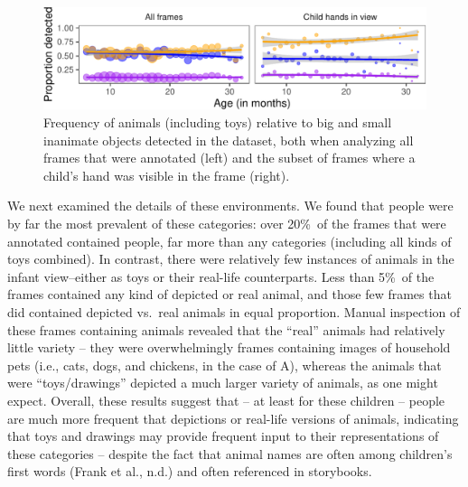 \documentclass[10pt, letterpaper]{article}
\newenvironment{CodeChunk}{}{}
\begin{document}
\begin{CodeChunk}
\begin{figure}[h]

{\centering \includegraphics{figs/anim_size-1} 

}

\caption[Frequency of animals (including toys) relative to big and small inanimate objects detected in the dataset, both when analyzing all frames that were annotated (left) and the subset of frames where a child's hand was visible in the frame (right)]{Frequency of animals (including toys) relative to big and small inanimate objects detected in the dataset, both when analyzing all frames that were annotated (left) and the subset of frames where a child's hand was visible in the frame (right).}\label{fig:anim_size}
\end{figure}
\end{CodeChunk}

We next examined the details of these environments. We found that people
were by far the most prevalent of these categories: over 20\%~of the
frames that were annotated contained people, far more than any
categories (including all kinds of toys combined). In contrast, there
were relatively few instances of animals in the infant view--either as
toys or their real-life counterparts. Less than 5\%~of the frames
contained any kind of depicted or real animal, and those few frames that
did contained depicted vs.~real animals in equal proportion. Manual
inspection of these frames containing animals revealed that the ``real''
animals had relatively little variety -- they were overwhelmingly frames
containing images of household pets (i.e., cats, dogs, and chickens, in
the case of A), whereas the animals that were ``toys/drawings'' depicted
a much larger variety of animals, as one might expect. Overall, these
results suggest that -- at least for these children -- people are much
more frequent that depictions or real-life versions of animals,
indicating that toys and drawings may provide frequent input to their
representations of these categories -- despite the fact that animal
names are often among children's first words (Frank et al., n.d.) and
often referenced in storybooks.
\end{document}
